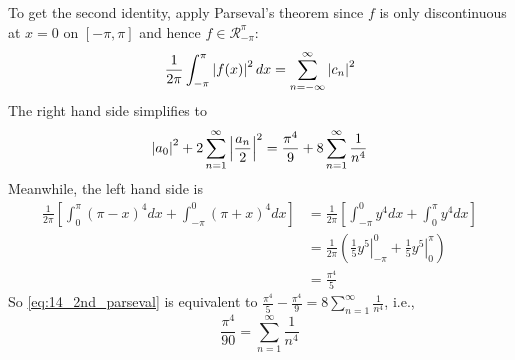 \documentclass[12pt]{article}
\begin{document}
To get the second identity, apply Parseval's theorem since $f$ is only discontinuous at $x = 0$ on $[-\pi, \pi]$ and hence $f \in \mathscr{R}_{-\pi}^{\pi}$: 
\begin{equation} \label{eq:14_2nd_parseval}
  \frac{1}{2\pi} \int_{-\pi}^{\pi} \left|f(x)\right|^2 dx = \sum_{n = -\infty}^{\infty} \left|c_n\right|^2
\end{equation}
The right hand side simplifies to 
$$\left|a_0\right|^2 + 2 \sum_{n = 1}^{\infty} \left|\frac{a_n}{2}\right|^2 = \frac{\pi^4}{9} + 8 \sum_{n = 1}^{\infty} \frac{1}{n^4}$$
Meanwhile, the left hand side is 
\begin{align*}
  \frac{1}{2\pi} \left[ \int_{0}^{\pi} (\pi - x)^4 dx + \int_{-\pi}^{0} (\pi + x)^4 dx \right] 
  & = \frac{1}{2\pi} \left[ \int_{-\pi}^{0} y^4 dx + \int_{0}^{\pi} y^4 dx \right] \\ 
  & = \frac{1}{2\pi} \left( \frac{1}{5} \left.y^5\right|_{-\pi}^{0} + \frac{1}{5}\left.y^5\right|_{0}^{\pi} \right) \\ 
  & = \frac{\pi^4}{5} 
\end{align*}
So \eqref{eq:14_2nd_parseval} is equivalent to $\frac{\pi^4}{5} - \frac{\pi^4}{9} = 8\sum_{n = 1}^{\infty} \frac{1}{n^4}$,
i.e., 
$$\frac{\pi^4}{90} = \sum_{n = 1}^{\infty} \frac{1}{n^4}$$
\end{document}
